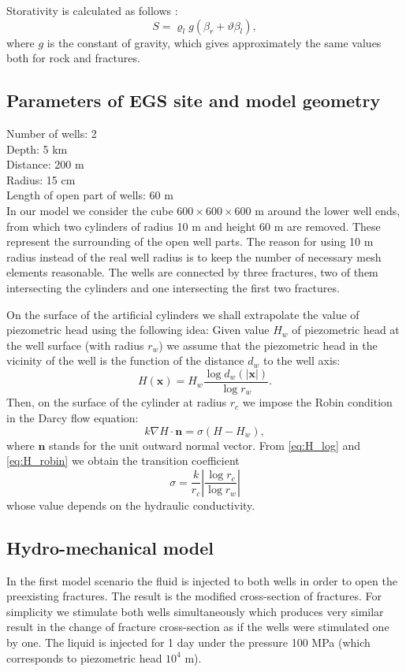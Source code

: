 \documentclass{article}
\newcommand{\eq}[1]{\begin{equation}#1\end{equation}}
\newcommand{\nn}{\vc n}
\newcommand{\vc}[1]{\boldsymbol{#1}}
\newcommand{\xx}{\vc x}
\begin{document}
Storativity is calculated as follows \cite{brace-et-al}:
\[ S = \varrho_l g(\beta_r + \vartheta\beta_l), \]
where $g$ is the constant of gravity, which gives approximately the same values both for rock and fractures.

\subsection{Parameters of EGS site and model geometry}

Number of wells: 2 \\
Depth: 5 km \\
Distance: 200 m \\
Radius: 15 cm \\
Length of open part of wells: 60 m \\


In our model we consider the cube $600 \times 600 \times 600$ m around the lower well ends, from which two cylinders of radius 10 m and height 60 m are removed.
These represent the surrounding of the open well parts.
The reason for using 10 m radius instead of the real well radius is to keep the number of necessary mesh elements reasonable.
The wells are connected by three fractures, two of them intersecting the cylinders and one intersecting the first two fractures.

On the surface of the artificial cylinders we shall extrapolate the value of piezometric head using the following idea: Given value $H_w$ of piezometric head at the well surface (with radius $r_w$) we assume that the piezometric head in the vicinity of the well is the function of the distance $d_w$ to the well axis:
\eq{\label{eq:H_log} H(\xx) = H_w\frac{\log d_w(|\xx|)}{\log r_w}. }
Then, on the surface of the cylinder at radius $r_c$ we impose the Robin condition in the Darcy flow equation:
\eq{\label{eq:H_robin} k\nabla H\cdot\nn = \sigma(H-H_w), }
where $\nn$ stands for the unit outward normal vector.
From \eqref{eq:H_log} and \eqref{eq:H_robin} we obtain the transition coefficient
\[ \sigma = \frac{k}{r_c}\left|\frac{\log r_c}{\log r_w}\right| \]
whose value depends on the hydraulic conductivity.


\subsection{Hydro-mechanical model}
\label{sc:hm_model}

In the first model scenario the fluid is injected to both wells in order to open the preexisting fractures.
The result is the modified cross-section of fractures.
For simplicity we stimulate both wells simultaneously which produces very similar result in the change of fracture cross-section as if the wells were stimulated one by one.
The liquid is injected for 1 day under the pressure 100 MPa (which corresponds to piezometric head $10^4$ m).
\end{document}
